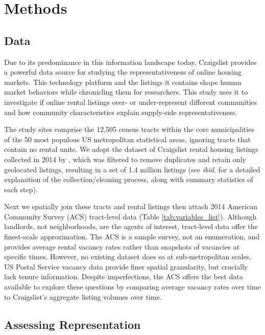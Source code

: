 \documentclass[11pt,letterpaper]{article}
\begin{document}
\section{Methods}

\subsection{Data}

Due to its predominance in this information landscape today, Craigslist provides a powerful data source for studying the representativeness of online housing markets. This technology platform and the listings it contains shape human market behaviors while chronicling them for researchers. This study uses it to investigate if online rental listings over- or under-represent different communities and how community characteristics explain supply-side representativeness.

The study sites comprise the 12,505 census tracts within the core municipalities of the 50 most populous US metropolitan statistical areas, ignoring tracts that contain no rental units. We adopt the dataset of Craigslist rental housing listings collected in 2014 by \citet{boeing_new_2017}, which was filtered to remove duplicates and retain only geolocated listings, resulting in a set of 1.4 million listings (see \textit{ibid.} for a detailed explanation of the collection/cleaning process, along with summary statistics of each step).

Next we spatially join these tracts and rental listings then attach 2014 American Community Survey (ACS) tract-level data (Table \ref{tab:variables_list}). Although landlords, not neighborhoods, are the agents of interest, tract-level data offer the finest-scale approximation. The ACS is a sample survey, not an enumeration, and provides average rental vacancy rates rather than snapshots of vacancies at specific times. However, no existing dataset does so at sub-metropolitan scales. US Postal Service vacancy data provide finer spatial granularity, but crucially lack tenure information. Despite imperfections, the ACS offers the best data available to explore these questions by comparing average vacancy rates over time to Craigslist's aggregate listing volumes over time.


\subsection{Assessing Representation}
\end{document}
